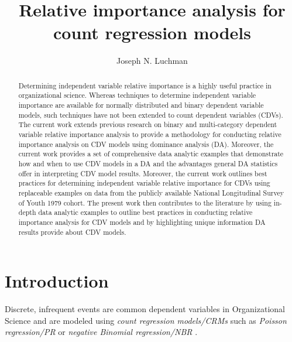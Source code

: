 \documentclass[ShortAfour,times,sageapa]{sagej}
\begin{document}
	
\title{Relative importance analysis for count regression models}
\author{Joseph N. Luchman}

\begin{abstract}
	Determining independent variable relative importance is a highly useful practice in organizational science.  Whereas techniques to determine independent variable importance are available for normally distributed and binary dependent variable models, such techniques have not been extended to count dependent variables (CDVs).  The current work extends previous research on binary and multi-category dependent variable relative importance analysis to provide a methodology for conducting relative importance analysis on CDV models using dominance analysis (DA).  Moreover, the current work provides a set of comprehensive data analytic examples that demonstrate how and when to use CDV models in a DA and the advantages general DA statistics offer in interpreting CDV model results.  Moreover, the current work outlines best practices for determining independent variable relative importance for CDVs using replaceable examples on data from the publicly available National Longitudinal Survey of Youth 1979 cohort.  The present work then contributes to the literature by using in-depth data analytic examples to outline best practices in conducting relative importance analysis for CDV models and by highlighting unique information DA results provide about CDV models.
\end{abstract}


\maketitle

\section{Introduction}

	Discrete, infrequent events are common dependent variables in Organizational Science \cite[e.g.,]{bettinazzi2021stakeholder,naumovska2021strength,soda2021networks} and are modeled using \textit{count regression models/CRMs} such as \textit{Poisson regression/PR} or \textit{negative Binomial regression/NBR} \cite{blevins2015count}.   %
	
\end{document}
